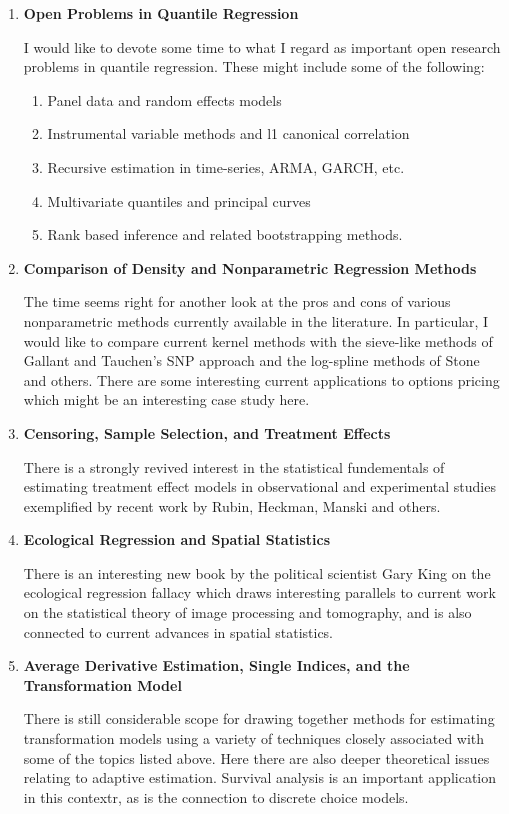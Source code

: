 \documentclass{article}
\begin{document}
\begin{enumerate}
\item{\bf Open Problems in Quantile Regression}

I would like to devote some time to what I regard as important open research
problems in quantile regression.  These might include some of the following:

\begin{enumerate}
\item  Panel data and random effects models
\item Instrumental variable methods and l1 canonical correlation
\item Recursive estimation in time-series, ARMA, GARCH, etc.
\item Multivariate quantiles and principal curves
\item Rank based inference and related bootstrapping methods.
\end{enumerate}

\item{\bf Comparison of Density and Nonparametric Regression Methods}

The time seems right for another look at the pros and cons of various
nonparametric methods currently available in the literature.  In
particular, I would like to compare current kernel methods with the
sieve-like methods of Gallant and Tauchen's SNP approach and the
log-spline methods of Stone and others.  There are some interesting
current applications to options pricing which might be an interesting
case study here.

\item {\bf Censoring, Sample Selection, and Treatment Effects}

There is a strongly revived interest in the statistical fundementals
of estimating treatment effect models in observational and experimental
studies exemplified by recent work by Rubin, Heckman, Manski and others.

\item {\bf Ecological Regression and Spatial Statistics}

There is an interesting new book by the political scientist Gary King
on the ecological regression fallacy which draws interesting
parallels to current work on the statistical theory of image
processing and tomography, and is also connected to current advances
in spatial statistics. 

\item {\bf Average Derivative Estimation, Single Indices, and the Transformation
Model}

There is still considerable scope for drawing together methods for
estimating transformation models using a variety of techniques 
closely associated with some of the topics listed above.  Here
there are also deeper theoretical issues relating to adaptive estimation.
Survival analysis is an important application in this contextr,
as is the connection to discrete choice models.

\end{enumerate}
\end{document}
